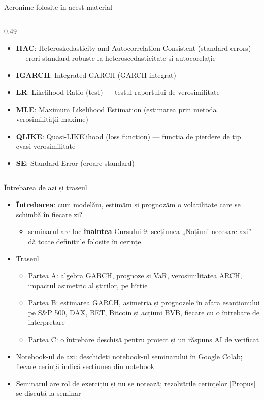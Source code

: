 \begin{frame}{Acronime folosite în acest material}
\begin{columns}[T]
\begin{column}{0.49\textwidth}
\begin{itemize}
    \item \textbf{HAC}: Heteroskedasticity and Autocorrelation Consistent (standard errors) — erori standard robuste la heteroscedasticitate și autocorelație
    \item \textbf{IGARCH}: Integrated GARCH (GARCH integrat)
    \item \textbf{LR}: Likelihood Ratio (test) — testul raportului de verosimilitate
    \item \textbf{MLE}: Maximum Likelihood Estimation (estimarea prin metoda verosimilității maxime)
    \item \textbf{QLIKE}: Quasi-LIKElihood (loss function) — funcția de pierdere de tip cvasi-verosimilitate
    \item \textbf{SE}: Standard Error (eroare standard)
\end{itemize}
\end{column}
\end{columns}
\end{frame}

\begin{frame}{Întrebarea de azi și traseul}
\itemsize{\small}
\begin{itemize}
    \item \textbf{Întrebarea}: cum modelăm, estimăm și prognozăm o volatilitate care se schimbă în fiecare zi?
    \begin{itemize}
        \item seminarul are loc \textbf{înaintea} Cursului 9: secțiunea „Noțiuni necesare azi” dă toate definițiile folosite în cerințe
    \end{itemize}
    \item Traseul
    \begin{itemize}
        \item Partea A: algebra GARCH, prognoze și VaR, verosimilitatea ARCH, impactul asimetric al știrilor, pe hîrtie
        \item Partea B: estimarea GARCH, asimetria și prognozele în afara eșantionului pe S\&P 500, DAX, BET, Bitcoin și acțiuni BVB, fiecare cu o întrebare de interpretare
        \item Partea C: o întrebare deschisă pentru proiect și un răspuns AI de verificat
    \end{itemize}
    \item Notebook-ul de azi: \href{\nb}{deschideți notebook-ul seminarului în Google Colab}; fiecare cerință indică secțiunea din notebook
    \item Seminarul are rol de exercițiu și nu se notează; rezolvările cerințelor [Propus] se discută la seminar
\end{itemize}
\end{frame}

